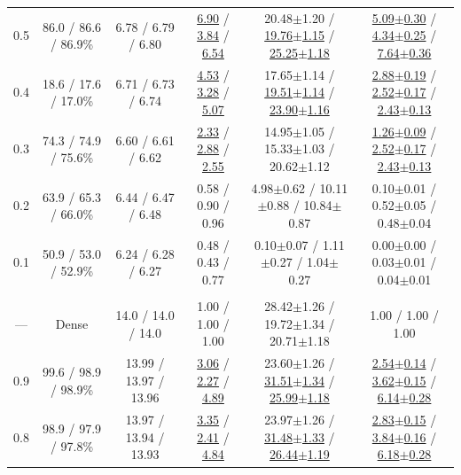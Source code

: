 \begin{table}[!t]
\begin{tabular}{cccccc}
0.5 & 86.0 / 86.6 / 86.9\% & 6.78 / 6.79 / 6.80 & \underline{6.90} / \underline{3.84} / \underline{6.54} & 20.48{\scriptsize$\pm$1.20} / \underline{19.76{\scriptsize$\pm$1.15}} / \underline{25.25{\scriptsize$\pm$1.18}} & \underline{5.09{\scriptsize$\pm$0.30}} / \underline{4.34{\scriptsize$\pm$0.25}} / \underline{7.64{\scriptsize$\pm$0.36}} \\
0.4 & 18.6 / 17.6 / 17.0\% & 6.71 / 6.73 / 6.74 & \underline{4.53} / \underline{3.28} / \underline{5.07} & 17.65{\scriptsize$\pm$1.14} / \underline{19.51{\scriptsize$\pm$1.14}} / \underline{23.90{\scriptsize$\pm$1.16}} & \underline{2.88{\scriptsize$\pm$0.19}} / \underline{2.52{\scriptsize$\pm$0.17}} / \underline{2.43{\scriptsize$\pm$0.13}} \\
0.3 & 74.3 / 74.9 / 75.6\% & 6.60 / 6.61 / 6.62 & \underline{2.33} / \underline{2.88} / \underline{2.55} & 14.95{\scriptsize$\pm$1.05} / 15.33{\scriptsize$\pm$1.03} / 20.62{\scriptsize$\pm$1.12} & \underline{1.26{\scriptsize$\pm$0.09}} / \underline{2.52{\scriptsize$\pm$0.17}} / \underline{2.43{\scriptsize$\pm$0.13}} \\
0.2 & 63.9 / 65.3 / 66.0\% & 6.44 / 6.47 / 6.48 & 0.58 / 0.90 / 0.96 & 4.98{\scriptsize$\pm$0.62} / 10.11{\scriptsize$\pm$0.88} / 10.84{\scriptsize$\pm$0.87} & 0.10{\scriptsize$\pm$0.01} / 0.52{\scriptsize$\pm$0.05} / 0.48{\scriptsize$\pm$0.04} \\
0.1 & 50.9 / 53.0 / 52.9\% & 6.24 / 6.28 / 6.27 & 0.48 / 0.43 / 0.77 & 0.10{\scriptsize$\pm$0.07} / 1.11{\scriptsize$\pm$0.27} / 1.04{\scriptsize$\pm$0.27} & 0.00{\scriptsize$\pm$0.00} / 0.03{\scriptsize$\pm$0.01} / 0.04{\scriptsize$\pm$0.01} \\
\addlinespace[0.5pt]
\rowcolor{lightgray} \multicolumn{6}{c}{\rule{0pt}{2.2ex}\textbf{Qwen2.5-14B}\rule[-0.8ex]{0pt}{0pt}} \\
--- & Dense & 14.0 / 14.0 / 14.0 & 1.00 / 1.00 / 1.00 & 28.42{\scriptsize$\pm$1.26} / 19.72{\scriptsize$\pm$1.34} / 20.71{\scriptsize$\pm$1.18} & 1.00 / 1.00 / 1.00 \\
0.9 & 99.6 / 98.9 / 98.9\% & 13.99 / 13.97 / 13.96 & \underline{3.06} / \underline{2.27} / \underline{4.89} & 23.60{\scriptsize$\pm$1.26} / \underline{31.51{\scriptsize$\pm$1.34}} / \underline{25.99{\scriptsize$\pm$1.18}} & \underline{2.54{\scriptsize$\pm$0.14}} / \underline{3.62{\scriptsize$\pm$0.15}} / \underline{6.14{\scriptsize$\pm$0.28}} \\
0.8 & 98.9 / 97.9 / 97.8\% & 13.97 / 13.94 / 13.93 & \underline{3.35} / \underline{2.41} / \underline{4.84} & 23.97{\scriptsize$\pm$1.26} / \underline{31.48{\scriptsize$\pm$1.33}} / \underline{26.44{\scriptsize$\pm$1.19}} & \underline{2.83{\scriptsize$\pm$0.15}} / \underline{3.84{\scriptsize$\pm$0.16}} / \underline{6.18{\scriptsize$\pm$0.28}} \\

\end{tabular}
\end{table}
